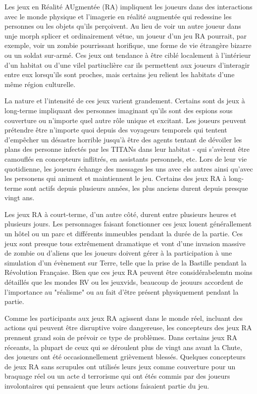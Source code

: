 Les jeux en Réalité AUgmentée (RA) impliquent les joueurs dans des interactions avec le monde physique et l'imagerie en réalité augmentée qui redessine les personnes ou les objets qu'ils perçoivent. Au lieu de voir un autre joueur dans unje morph splicer et ordinairement vétue, un joueur d'un jeu RA pourrait, par exemple, voir un zombie pourrissant horifique, une forme de vie étrangère bizarre ou un soldat sur-armé. Ces jeux ont tendance à être ciblé localement à l'intérieur d'un habitat ou d'une vilel partiuclière car ils permettent aux joueurs d'interagir entre eux lorsqu'ils sont proches, mais certains jeu relient les habitats d'une même région culturelle. 

La nature et l'intensité de ces jeux varient grandement. Certains sont ds jeux à long-terme impliquant des personnes imaginant qu'ils sont des espions sous couverture ou n'importe quel autre rôle unique et excitant. Les joueurs peuvent prétendre être n'importe quoi depuis des voyageurs temporels qui tentent d'empêcher un désastre horrible jusqu'à être des agents tentant de dévoiler les plans des personne infectés par les TITANs dans leur habitat - qui s'avèrent être camouflés en concepteurs inflitrés, en assistants personnels, etc. Lors de leur vie quotidienne, les joueurs échange des messages les uns avec els autres ainsi qu'avec les personens qui animent et maintiennent le jeu. Certains des jeux RA à long-terme sont actifs depuis plusieurs années, les plus anciens durent depuis presque vingt ans. 

Les jeux RA à court-terme, d'un autre côté, durent entre plusieurs heures et plusieurs jours. Les personnages faisant fonctionner ces jeux louent générallement un hôtel ou un parc et différents immeubles pendant la durée de la partie. Ces jeux sont presque tous extrêmement dramatique et vont d'une invasion massive de zombie ou d'aliens que les joueurs doivent gérer à la participation à une simulation d'un évènement sur Terre, telle que la prise de la Bastille pendant la Révolution Française. Bien que ces jeux RA peuvent être considérabelemtn moins détaillés que les mondes RV ou les jeuxvids, beaucoup de jeouurs accordent de l'importance au "réalisme" ou au fait d'être présent physiquement pendant la partie. 

Comme les participants aux jeux RA agissent dans le monde réel, incluant des actions qui peuvent être disruptive voire dangereuse, les concepteurs des jeux RA prennent grand soin de prévoir ce type de problèmes. Dans certains jeux RA réceants, la plupart de ceux qui se déroulent plus de vingt ans avant la Chute, des joueurs ont été occasionnellement grièvement blessés. Quelques concepteurs de jeux RA sans scrupules ont utilisés leurs jeux comme couverture pour un braquage réel ou un acte d terrorisme qui ont étés commis par des joueurs involontaires qui pensaient que leurs actions faisaient partie du jeu. 

